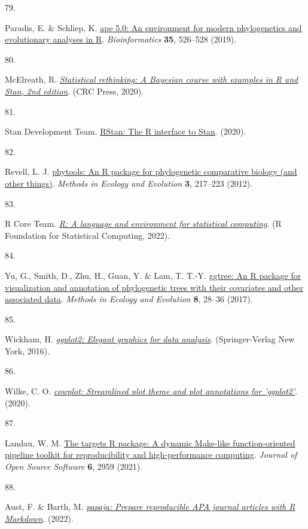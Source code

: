 \documentclass[
  man,floatsintext]{apa6}
\newlength{\cslhangindent}
\newlength{\csllabelwidth}
\newlength{\cslentryspacingunit} %
\newenvironment{CSLReferences}[2] %
 {%
  \setlength{\parindent}{0pt}
  \ifodd #1
  \let\oldpar\par
  \def\par{\hangindent=\cslhangindent\oldpar}
  \fi
  \setlength{\parskip}{#2\cslentryspacingunit}
 }%
 {}
\newcommand{\CSLLeftMargin}[1]{\parbox[t]{\csllabelwidth}{#1}}
\newcommand{\CSLRightInline}[1]{\parbox[t]{\linewidth - \csllabelwidth}{#1}\break}
\begin{document}
\begin{CSLReferences}{0}{0}
\leavevmode{}%
\CSLLeftMargin{79. }%
\CSLRightInline{Paradis, E. \& Schliep, K. \href{https://doi.org/10.1093/bioinformatics/bty633}{{ape} 5.0: An environment for modern phylogenetics and evolutionary analyses in {R}}. \emph{Bioinformatics} \textbf{35}, 526--528 (2019).}

\leavevmode{}%
\CSLLeftMargin{80. }%
\CSLRightInline{McElreath, R. \emph{\href{http://xcelab.net/rm/statistical-rethinking/}{Statistical rethinking: A {Bayesian} course with examples in {R} and {Stan}, 2nd edition}}. (CRC Press, 2020).}

\leavevmode{}%
\CSLLeftMargin{81. }%
\CSLRightInline{Stan Development Team. \href{http://mc-stan.org/}{{RStan}: The {R} interface to {Stan}}. (2020).}

\leavevmode{}%
\CSLLeftMargin{82. }%
\CSLRightInline{Revell, L. J. \href{https://doi.org/10.1111/j.2041-210X.2011.00169.x}{{phytools}: An {R} package for phylogenetic comparative biology (and other things)}. \emph{Methods in Ecology and Evolution} \textbf{3}, 217--223 (2012).}

\leavevmode{}%
\CSLLeftMargin{83. }%
\CSLRightInline{R Core Team. \emph{\href{https://www.R-project.org/}{R: A language and environment for statistical computing}}. (R Foundation for Statistical Computing, 2022).}

\leavevmode{}%
\CSLLeftMargin{84. }%
\CSLRightInline{Yu, G., Smith, D., Zhu, H., Guan, Y. \& Lam, T. T.-Y. \href{https://doi.org/10.1111/2041-210X.12628}{{ggtree}: An {R} package for visualization and annotation of phylogenetic trees with their covariates and other associated data}. \emph{Methods in Ecology and Evolution} \textbf{8}, 28--36 (2017).}

\leavevmode{}%
\CSLLeftMargin{85. }%
\CSLRightInline{Wickham, H. \emph{\href{https://ggplot2.tidyverse.org}{{ggplot2}: Elegant graphics for data analysis}}. (Springer-Verlag New York, 2016).}

\leavevmode{}%
\CSLLeftMargin{86. }%
\CSLRightInline{Wilke, C. O. \emph{\href{https://CRAN.R-project.org/package=cowplot}{{cowplot}: Streamlined plot theme and plot annotations for 'ggplot2'}}. (2020).}

\leavevmode{}%
\CSLLeftMargin{87. }%
\CSLRightInline{Landau, W. M. \href{https://doi.org/10.21105/joss.02959}{The targets {R} package: A dynamic {M}ake-like function-oriented pipeline toolkit for reproducibility and high-performance computing}. \emph{Journal of Open Source Software} \textbf{6}, 2959 (2021).}

\leavevmode{}%
\CSLLeftMargin{88. }%
\CSLRightInline{Aust, F. \& Barth, M. \emph{\href{https://github.com/crsh/papaja}{{papaja}: {Prepare} reproducible {APA} journal articles with {R Markdown}}}. (2022).}

\end{CSLReferences}
\end{document}
